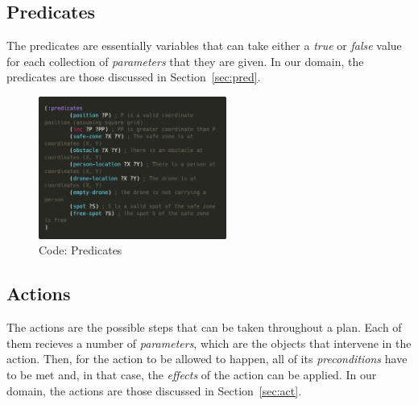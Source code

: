 \documentclass{article}
\begin{document}
\subsection{Predicates}
The predicates are essentially variables that can take either a \textit{true} or \textit{false} value for each collection of \textit{parameters} that they are given. In our domain, the predicates are those discussed in Section~\ref{sec:pred}.
\begin{figure}[ht]
    \centering
    \includegraphics[width=0.55\textwidth]{assets/solution_coordinates/predicates.png}
    \caption{Code: Predicates}
    \label{fig:pred}
\end{figure}

\subsection{Actions}
The actions are the possible steps that can be taken throughout a plan. Each of them recieves a number of \textit{parameters}, which are the objects that intervene in the action. Then, for the action to be allowed to happen, all of its \textit{preconditions} have to be met and, in that case, the \textit{effects} of the action can be applied. In our domain, the actions are those discussed in Section~\ref{sec:act}.
\end{document}
